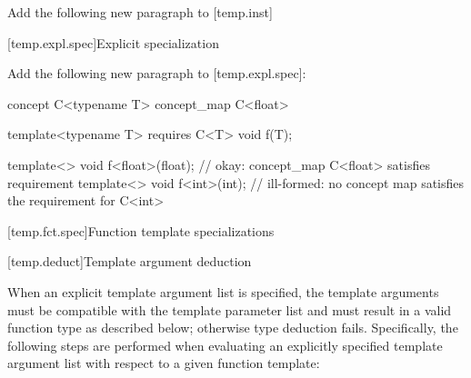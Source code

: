 \documentclass[american]{book}
\newcommand{\editorial}[1]{\colorbox{editbackground}{\begin{minipage}{\linewidth
}#1\end{minipage}}}
\begin{document}
\begin{paras}
\noindent\editorial{Add the following new paragraph to [temp.inst]}
\setcounter{Paras}{14}
\pnum
{}

[temp.expl.spec]{Explicit specialization}

\noindent\editorial{Add the following new paragraph to [temp.expl.spec]:}

\setcounter{Paras}{22}
\color{addclr}
\pnum
{}
\begin{codeblock}
concept C<typename T> { }
concept_map C<float> { }

template<typename T> requires C<T> void f(T);

template<> void f<float>(float); // okay: concept_map C<float> satisfies requirement
template<> void f<int>(int); // ill-formed: no concept map satisfies the requirement for C<int>
\end{codeblock}
\addedConcepts{\mbox{\exitexample} \mbox{\exitnote}}
\color{black}

[temp.fct.spec]{Function template specializations}

\setcounter{subsection}{1}
[temp.deduct]{Template argument deduction}
\setcounter{Paras}{1}
\pnum
{}

\pnum
When an explicit template argument list is specified, the template
arguments must be compatible with the template parameter list and must
result in a valid function type as described below; otherwise type
deduction fails.  Specifically, the following steps are performed when
evaluating an explicitly specified template argument list with respect
to a given function template:


\end{paras}
\end{document}
